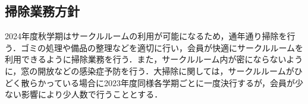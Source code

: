 \subsection*{掃除業務方針}


2024年度秋学期はサークルルームの利用が可能になるため，通年通り掃除を行う．ゴミの処理や備品の整理などを適切に行い，会員が快適にサークルルームを利用できるように掃除業務を行う．また，サークルルーム内が密にならないように，窓の開放などの感染症予防を行う．大掃除に関しては，サークルルームがひどく散らかっている場合に2023年度同様各学期ごとに一度決行するが，会員が少ない影響により少人数で行うこととする．
